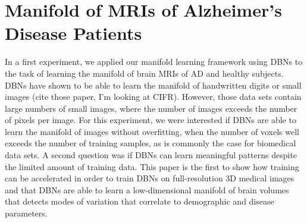 



\section{Manifold of MRIs of Alzheimer's Disease Patients}


In a first experiment, we applied our manifold learning framework using DBNs to
the task of learning the manifold of brain MRIs of AD and healthy subjects. DBNs
have shown to be able to learn the manifold of handwritten digits or small
images (cite those paper, I'm looking at CIFR). However, those data sets contain
large numbers of small images, where the number of images exceeds the number of
pixels per image. For this experiment, we were interested if DBNs are able to
learn the manifold of images without overfitting, when the number of voxels well
exceeds the number of training samples, as is commonly the case for biomedical
data sets. A second question was if DBNs can learn meaningful patterns
despite the limited amount of training data. This paper is the first to show how
training can be accelerated in order to train DBNs on full-resolution 3D medical
images and that DBNs are able to learn a low-dimensional manifold of brain
volumes that detects modes of variation that correlate to demographic and
disease parameters.


